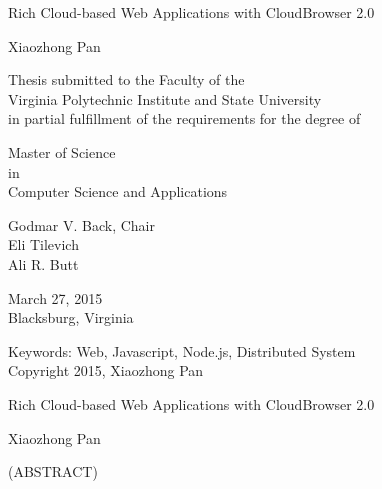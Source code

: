 \documentclass[12pt]{report}
\begin{document}
\newcommand{\cb}{CloudBrowser\xspace}
\newcommand{\projectname}{CloudBrowser\xspace}
\newcommand{\cbtwo}{CloudBrowser 2.0\xspace}
\newcommand{\js}{JavaScript\xspace}
\newcommand{\nodejs}{Node.js\xspace}
\newcommand{\appins}{App Instance\xspace}
\newcommand{\jsdom}{JSDOM\xspace}
\newcommand{\citemain}{~\cite{mcdaniel2012cloudbrowser}}
\newcommand{\etdtitle}{Rich Cloud-based Web Applications with \cbtwo}

\newcommand{\longcaption}[2]{\caption[#1]{#1 #2}}



\def\code#1{\texttt{#1}}
\def\nodermi{\texttt{nodermi\xspace}}

\thispagestyle{empty}
\begin{center}

{\Large 
\etdtitle{}
}

\vfill

Xiaozhong Pan

\vfill

Thesis submitted to the Faculty of the \\
Virginia Polytechnic Institute and State University \\
in partial fulfillment of the requirements for the degree of

\vfill

Master of Science \\
in \\
Computer Science and Applications

\vfill

Godmar V. Back, Chair \\
Eli Tilevich\\
Ali R. Butt

\vfill

March 27, 2015 \\
Blacksburg, Virginia

\vfill

Keywords: Web, Javascript, Node.js, Distributed System
\\
Copyright 2015, Xiaozhong Pan

\end{center}

\pagebreak

\thispagestyle{empty}
\begin{center}

{\large \etdtitle{}}

\vfill

Xiaozhong Pan

\vfill

(ABSTRACT)

\vfill

\end{center}
\end{document}
